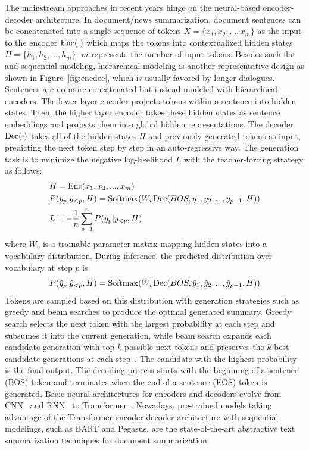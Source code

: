 The mainstream approaches in recent years hinge on the neural-based encoder-decoder architecture.  
In document/news summarization, 
document sentences can be concatenated into a single sequence of tokens $X=\{x_1, x_2, ..., x_m\}$ as the input to the encoder ${\rm Enc}(\cdot)$ which maps the tokens into 
contextualized hidden states $H = \{h_1, h_2, ..., h_m\}$. $m$ represents the number of input tokens. 
Besides such flat and sequential modeling, hierarchical modeling is another representative design as shown in Figure~\ref{fig:encdec}, which is usually favored by longer dialogues. Sentences are no more concatenated but instead modeled with hierarchical encoders. The lower layer encoder projects tokens within a sentence into hidden states. Then, the higher layer encoder takes these hidden states as sentence embeddings and projects them into global hidden representations.
The decoder ${\rm Dec}(\cdot)$ takes all of the hidden states $H$ and previously generated tokens 
as input, predicting the next token step by step in an auto-regressive way. The generation task is to minimize the negative log-likelihood $L$ with the teacher-forcing strategy as follows:
\begin{equation}
	\begin{aligned}
		&H= {\rm Enc}(x_1, x_2, ..., x_m) \\
		&P(y_p|y_{<p},H) = {\rm Softmax}(W_v{\rm Dec}(BOS, y_1, y_2, ..., y_{p-1}, H))\\
		&L = -\frac{1}{n}\sum_{p=1}^n P(y_p|y_{<p}, H) 
	\end{aligned}
\end{equation}
where $W_v$ is a trainable parameter matrix mapping hidden states into a vocabulary distribution. During inference, the predicted distribution over vocabulary at step $p$ is:
\begin{equation}
		P(\hat{y}_p|\hat{y}_{<p},H) = {\rm Softmax}(W_v{\rm Dec}(BOS, \hat{y}_1, \hat{y}_2, ..., \hat{y}_{p-1}, H))
\end{equation}
Tokens are sampled based on this distribution with generation strategies such as greedy and beam searches to produce the optimal generated summary. 
Greedy search selects the next token with the largest probability at each step and subsumes it into the current generation, while beam search expands each candidate generation with top-$k$ possible next tokens and preserves the $k$-best candidate generations at each step~\cite{rush2015neural}. The candidate with the highest probability is the final output.
The decoding process starts with the beginning of a sentence (BOS) token and terminates when the end of a sentence (EOS) token is generated. 
Basic neural architectures for encoders and decoders evolve from CNN~\cite{lecun1989handwritten,gehring2017convolutional} and RNN~\cite{rumelhart1985learning,nallapati2016abstractive} to Transformer~\cite{vaswani2017attention}. Nowadays, pre-trained models taking advantage of the Transformer encoder-decoder architecture with sequential modelings, such as BART and Pegasus, are the state-of-the-art abstractive text summarization techniques for document summarization.

